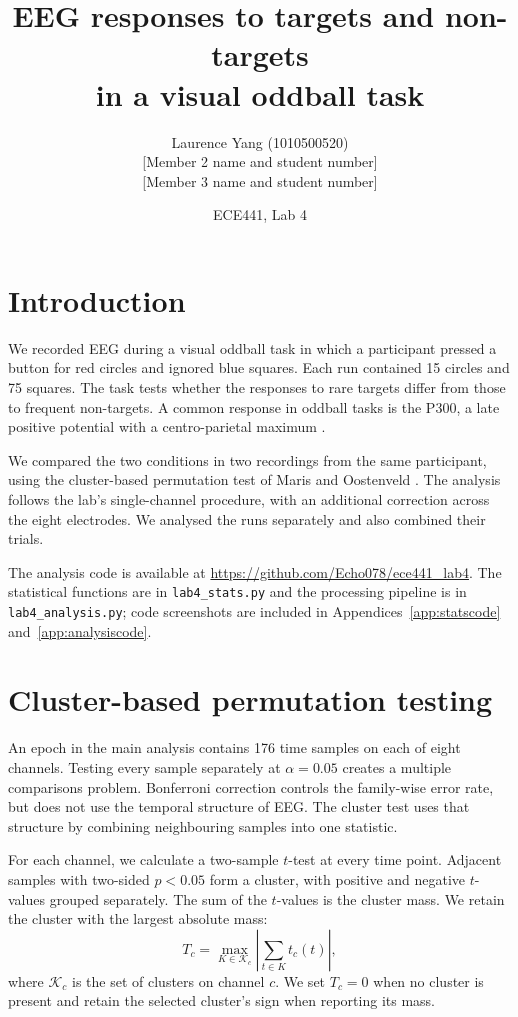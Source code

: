 \documentclass[11pt,a4paper]{article}
\title{EEG responses to targets and non-targets\\in a visual oddball task}
\author{Laurence Yang (1010500520)\\[2pt]
  \small [Member 2 name and student number]\\
  \small [Member 3 name and student number]}
\date{ECE441, Lab 4}
\begin{document}
\maketitle
\vspace{-1em}

\section{Introduction}

We recorded EEG during a visual oddball task in which a participant pressed a
button for red circles and ignored blue squares. Each run contained 15 circles
and 75 squares. The task tests whether the responses to rare targets differ from
those to frequent non-targets. A common response in oddball tasks is the P300,
a late positive potential with a centro-parietal maximum \cite{polich}.

We compared the two conditions in two recordings from the same participant,
using the cluster-based permutation test of Maris and Oostenveld \cite{maris}.
The analysis follows the lab's single-channel procedure, with an additional
correction across the eight electrodes. We analysed the runs separately and
also combined their trials.

The analysis code is available at
\url{https://github.com/Echo078/ece441_lab4}.
The statistical functions are in \texttt{lab4\_stats.py} and the processing
pipeline is in \texttt{lab4\_analysis.py}; code screenshots are included in
Appendices~\ref{app:statscode} and~\ref{app:analysiscode}.

\section{Cluster-based permutation testing}

An epoch in the main analysis contains 176 time samples on each of eight
channels. Testing every sample separately at $\alpha=0.05$ creates a multiple
comparisons problem. Bonferroni correction controls the family-wise error rate,
but does not use the temporal structure of EEG. The cluster test uses that
structure by combining neighbouring samples into one statistic.

For each channel, we calculate a two-sample $t$-test at every time point.
Adjacent samples with two-sided $p<0.05$ form a cluster, with positive and
negative $t$-values grouped separately. The sum of the $t$-values is the cluster
mass. We retain the cluster with the largest absolute mass:
\begin{equation}
  T_c=\max_{K\in\mathcal{K}_c}\left|\sum_{t\in K}t_c(t)\right|,
\end{equation}
where $\mathcal{K}_c$ is the set of clusters on channel $c$. We set $T_c=0$
when no cluster is present and retain the selected cluster's sign when
reporting its mass.
\end{document}
